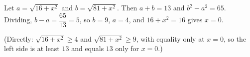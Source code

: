Let $a=\sqrt{16+x^2}$ and $b=\sqrt{81+x^2}$. Then $a+b=13$ and $b^2-a^2=65$. Dividing, $b-a=\dfrac{65}{13}=5$, so $b=9$, $a=4$, and $16+x^2=16$ gives $\boxed{x=0}$.

(Directly: $\sqrt{16+x^2}\ge4$ and $\sqrt{81+x^2}\ge9$, with equality only at $x=0$, so the left side is at least $13$ and equals $13$ only for $x=0$.)
